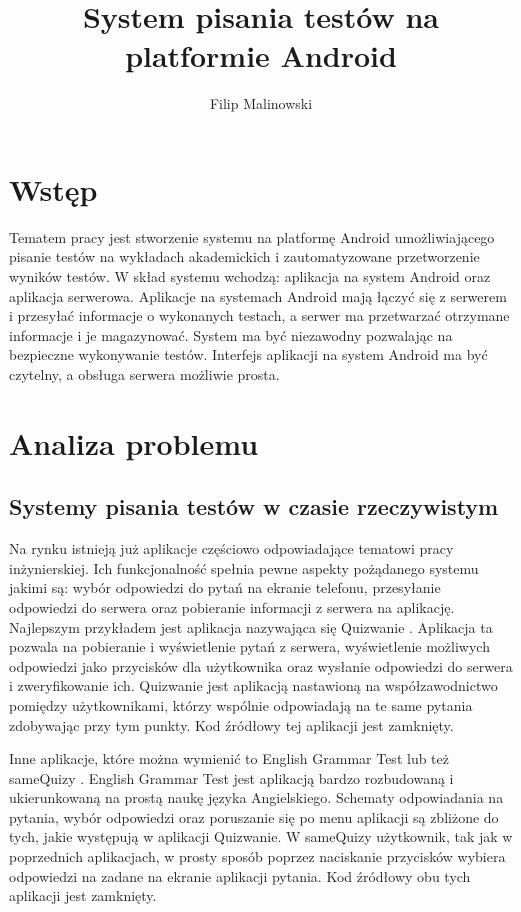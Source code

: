 \documentclass[eng]{mgr}
\title{System pisania testów na platformie Android}
\author{Filip Malinowski}
\begin{document}
\maketitle

\tableofcontents

	\chapter*{Wstęp}
	
	Tematem pracy jest stworzenie systemu na platformę Android umożliwiającego pisanie testów na wykładach akademickich i zautomatyzowane przetworzenie wyników testów. W skład systemu wchodzą: aplikacja na system Android oraz aplikacja serwerowa. Aplikacje na systemach Android mają łączyć się z serwerem i przesyłać informacje o wykonanych testach, a serwer ma przetwarzać otrzymane informacje i je magazynować. System ma być niezawodny pozwalając na bezpieczne wykonywanie testów. Interfejs aplikacji na system Android ma być czytelny, a obsługa serwera możliwie prosta.

	
	\chapter{Analiza problemu}
	
		\section{Systemy pisania testów w czasie rzeczywistym}
		Na rynku istnieją już aplikacje częściowo odpowiadające tematowi pracy inżynierskiej. Ich funkcjonalność spełnia pewne aspekty pożądanego systemu jakimi są: wybór odpowiedzi do pytań na ekranie telefonu, przesyłanie odpowiedzi do serwera oraz pobieranie informacji z serwera na aplikację. Najlepszym przykładem jest aplikacja nazywająca się Quizwanie \cite{quizwanie}. Aplikacja ta pozwala na pobieranie i wyświetlenie pytań z serwera, wyświetlenie możliwych odpowiedzi jako przycisków dla użytkownika oraz wysłanie odpowiedzi do serwera i zweryfikowanie ich. Quizwanie jest aplikacją nastawioną na współzawodnictwo pomiędzy użytkownikami, którzy wspólnie odpowiadają na te same pytania zdobywając przy tym punkty. Kod źródłowy tej aplikacji jest zamknięty.
	
		Inne aplikacje, które można wymienić to English Grammar Test \cite{englishgrammar} lub też sameQuizy \cite{samequizy}. English Grammar Test jest aplikacją bardzo rozbudowaną i ukierunkowaną na prostą naukę języka Angielskiego. Schematy odpowiadania na pytania, wybór odpowiedzi oraz poruszanie się po menu aplikacji są zbliżone do tych, jakie występują w aplikacji Quizwanie. W sameQuizy użytkownik, tak jak w poprzednich aplikacjach, w prosty sposób poprzez naciskanie przycisków wybiera odpowiedzi na zadane na ekranie aplikacji pytania. Kod źródłowy obu tych aplikacji jest zamknięty.
		
\end{document}
